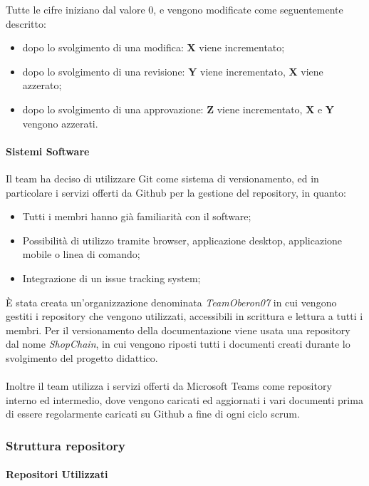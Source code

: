 Tutte le cifre iniziano dal valore 0, e vengono modificate come seguentemente descritto:
\begin{itemize}
    \item dopo lo svolgimento di una modifica: \textbf{X} viene incrementato;
    \item dopo lo svolgimento di una revisione: \textbf{Y} viene incrementato, \textbf{X} viene azzerato;
    \item dopo lo svolgimento di una approvazione: \textbf{Z} viene incrementato, \textbf{X} e \textbf{Y} vengono azzerati.
\end{itemize}

\paragraph{Sistemi Software}
Il team ha deciso di utilizzare Git come sistema di versionamento, ed in particolare i servizi offerti da Github per la gestione del repository, in quanto:
\begin{itemize}
    \item Tutti i membri hanno già familiarità con il software;
    \item Possibilità di utilizzo tramite browser, applicazione desktop, applicazione mobile o linea di comando;
    \item Integrazione di un issue tracking system;
\end{itemize}

È stata creata un'organizzazione denominata \textit{TeamOberon07} in cui vengono gestiti i repository che vengono utilizzati, accessibili in scrittura e lettura a tutti i membri.
Per il versionamento della documentazione viene usata una repository dal nome \textit{ShopChain}, in cui vengono riposti tutti i
documenti creati durante lo svolgimento del progetto didattico. \\
\\
Inoltre il team utilizza i servizi offerti da Microsoft Teams come repository interno ed intermedio, dove vengono caricati ed aggiornati i vari documenti prima di essere regolarmente caricati su Github a fine di ogni ciclo scrum.

\subsubsection{Struttura repository}
\paragraph{Repositori Utilizzati}

